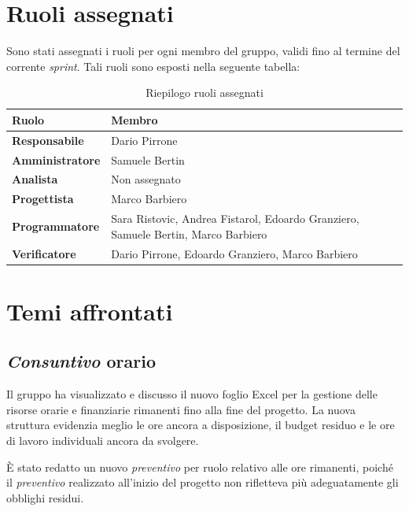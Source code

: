 \documentclass[12pt, a4paper]{article}
\begin{document}
\newpage
\section{Ruoli assegnati}
Sono stati assegnati i ruoli per ogni membro del gruppo, validi fino al termine del corrente \textit{sprint}. Tali ruoli sono esposti nella seguente tabella:

\begin{table}[htbp]
    \centering
    \renewcommand{\arraystretch}{1.3}
    \begin{tabularx}{\textwidth}{|l|X|}
        \hline
        \textbf{Ruolo} & \textbf{Membro} \\ \hline
        \textbf{Responsabile} & Dario Pirrone \\ \hline
        \textbf{Amministratore} & Samuele Bertin  \\ \hline
        \textbf{Analista} & Non assegnato   \\ \hline
        \textbf{Progettista} & Marco Barbiero \\ \hline
        \textbf{Programmatore} & Sara Ristovic, Andrea Fistarol, Edoardo Granziero, Samuele Bertin, Marco Barbiero  \\ \hline
        \textbf{Verificatore} & Dario Pirrone, Edoardo Granziero, Marco Barbiero \\ \hline
    \end{tabularx}
    \caption{Riepilogo ruoli assegnati}
\end{table}


\section{Temi affrontati}

\subsection{\textit{Consuntivo} orario}
Il gruppo ha visualizzato e discusso il nuovo foglio Excel per la gestione delle risorse orarie e finanziarie rimanenti fino alla fine del progetto. La nuova struttura evidenzia meglio le ore ancora a disposizione, il budget residuo e le ore di lavoro individuali ancora da svolgere.

È stato redatto un nuovo \textit{preventivo} per ruolo relativo alle ore rimanenti, poiché il \textit{preventivo} realizzato all'inizio del progetto non rifletteva più adeguatamente gli obblighi residui.
\end{document}
